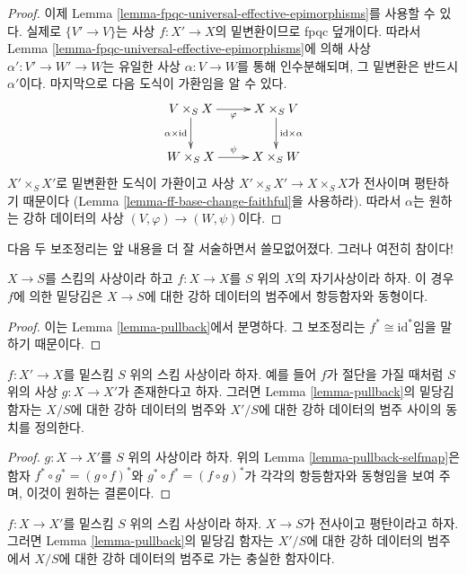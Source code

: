 \begin{proof}
\medskip\noindent
이제 Lemma \ref{lemma-fpqc-universal-effective-epimorphisms}를 사용할
수 있다. 실제로 $\{V' \to V\}$는 사상 $f : X' \to X$의 밑변환이므로
fpqc 덮개이다. 따라서 Lemma
\ref{lemma-fpqc-universal-effective-epimorphisms}에 의해 사상
$\alpha' : V' \to W' \to W$는 유일한 사상 $\alpha : V \to W$를 통해
인수분해되며, 그 밑변환은 반드시 $\alpha'$이다. 마지막으로 다음
도식이 가환임을 알 수 있다.
$$
\xymatrix{
V \times_S X \ar[r]_{\varphi} \ar[d]_{\alpha \times \text{id}} &
X \times_S V \ar[d]^{\text{id} \times \alpha} \\
W \times_S X \ar[r]^{\psi} & X \times_S W
}
$$
$X' \times_S X'$로 밑변환한 도식이 가환이고 사상
$X' \times_S X' \to X \times_S X$가 전사이며 평탄하기 때문이다
(Lemma \ref{lemma-ff-base-change-faithful}을 사용하라). 따라서
$\alpha$는 원하는 강하 데이터의 사상
$(V, \varphi) \to (W, \psi)$이다.
\end{proof}

\noindent
다음 두 보조정리는 앞 내용을 더 잘 서술하면서 쓸모없어졌다.
그러나 여전히 참이다!

\begin{lemma}
\label{lemma-pullback-selfmap}
$X \to S$를 스킴의 사상이라 하고 $f : X \to X$를 $S$ 위의
$X$의 자기사상이라 하자. 이 경우 $f$에 의한 밑당김은 $X \to S$에
대한 강하 데이터의 범주에서 항등함자와 동형이다.
\end{lemma}

\begin{proof}
이는 Lemma \ref{lemma-pullback}에서 분명하다. 그 보조정리는
$f^* \cong \text{id}^*$임을 말하기 때문이다.
\end{proof}

\begin{lemma}
\label{lemma-morphism-with-section-equivalence}
$f : X' \to X$를 밑스킴 $S$ 위의 스킴 사상이라 하자. 예를 들어
$f$가 절단을 가질 때처럼 $S$ 위의 사상 $g : X \to X'$가 존재한다고
하자. 그러면 Lemma \ref{lemma-pullback}의 밑당김 함자는 $X/S$에
대한 강하 데이터의 범주와 $X'/S$에 대한 강하 데이터의 범주 사이의
동치를 정의한다.
\end{lemma}

\begin{proof}
$g : X \to X'$를 $S$ 위의 사상이라 하자. 위의 Lemma
\ref{lemma-pullback-selfmap}은 함자
$f^* \circ g^* = (g \circ f)^*$와 $g^* \circ f^* = (f \circ g)^*$가
각각의 항등함자와 동형임을 보여 주며, 이것이 원하는 결론이다.
\end{proof}

\begin{lemma}
\label{lemma-morphism-source-faithfully-flat}
$f : X \to X'$를 밑스킴 $S$ 위의 스킴 사상이라 하자.
$X \to S$가 전사이고 평탄이라고 하자. 그러면 Lemma
\ref{lemma-pullback}의 밑당김 함자는 $X'/S$에 대한 강하 데이터의
범주에서 $X/S$에 대한 강하 데이터의 범주로 가는 충실한 함자이다.
\end{lemma}

